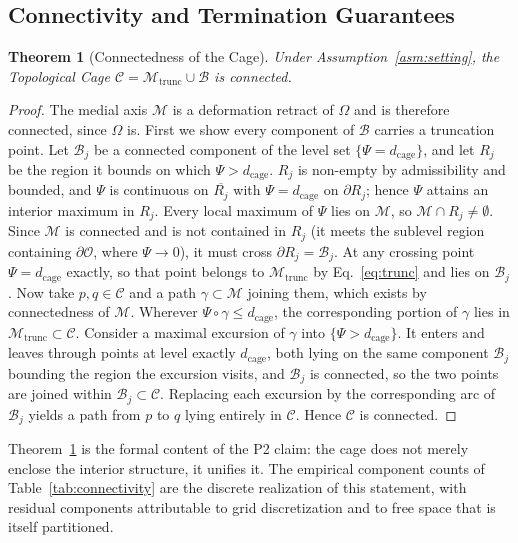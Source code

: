 \documentclass[conference]{IEEEtran}
\newtheorem{theorem}{Theorem}
\begin{document}
\subsection{Connectivity and Termination Guarantees}
\begin{theorem}[Connectedness of the Cage]
\label{thm:connected}
Under Assumption~\ref{asm:setting}, the Topological Cage $\mathcal{C}=\mathcal{M}_{\mathrm{trunc}}\cup\mathcal{B}$ is connected.
\end{theorem}
\begin{proof}
The medial axis $\mathcal{M}$ is a deformation retract of $\Omega$ and is therefore connected, since $\Omega$ is.
First we show every component of $\mathcal{B}$ carries a truncation point. Let $\mathcal{B}_j$ be a connected component of the level set $\{\Psi=d_{\mathrm{cage}}\}$, and let $R_j$ be the region it bounds on which $\Psi>d_{\mathrm{cage}}$. $R_j$ is non-empty by admissibility and bounded, and $\Psi$ is continuous on $\overline{R_j}$ with $\Psi=d_{\mathrm{cage}}$ on $\partial R_j$; hence $\Psi$ attains an interior maximum in $R_j$. Every local maximum of $\Psi$ lies on $\mathcal{M}$, so $\mathcal{M}\cap R_j\neq\emptyset$. Since $\mathcal{M}$ is connected and is not contained in $R_j$ (it meets the sublevel region containing $\partial\mathcal{O}$, where $\Psi\to 0$), it must cross $\partial R_j=\mathcal{B}_j$. At any crossing point $\Psi=d_{\mathrm{cage}}$ exactly, so that point belongs to $\mathcal{M}_{\mathrm{trunc}}$ by Eq.~\eqref{eq:trunc} and lies on $\mathcal{B}_j$.
Now take $p,q\in\mathcal{C}$ and a path $\gamma\subset\mathcal{M}$ joining them, which exists by connectedness of $\mathcal{M}$. Wherever $\Psi\circ\gamma\le d_{\mathrm{cage}}$, the corresponding portion of $\gamma$ lies in $\mathcal{M}_{\mathrm{trunc}}\subset\mathcal{C}$. Consider a maximal excursion of $\gamma$ into $\{\Psi>d_{\mathrm{cage}}\}$. It enters and leaves through points at level exactly $d_{\mathrm{cage}}$, both lying on the same component $\mathcal{B}_j$ bounding the region the excursion visits, and $\mathcal{B}_j$ is connected, so the two points are joined within $\mathcal{B}_j\subset\mathcal{C}$. Replacing each excursion by the corresponding arc of $\mathcal{B}_j$ yields a path from $p$ to $q$ lying entirely in $\mathcal{C}$. Hence $\mathcal{C}$ is connected.
\end{proof}
Theorem~\ref{thm:connected} is the formal content of the P2 claim: the cage does not merely enclose the interior structure, it unifies it. The empirical component counts of Table~\ref{tab:connectivity} are the discrete realization of this statement, with residual components attributable to grid discretization and to free space that is itself partitioned.
\end{document}
